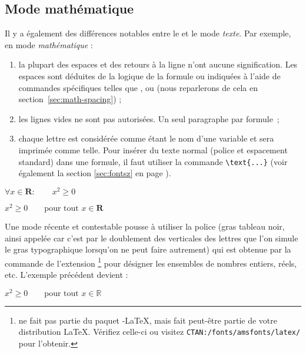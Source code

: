 \subsection{Mode mathématique}


Il y a également des différences notables entre le  et le mode \emph{texte}. Par exemple, en mode
\emph{mathématique} :

\begin{enumerate}
\item {}
      la plupart des espaces et des retours à la ligne n'ont aucune
      signification. Les espaces sont déduites de la logique de la
      formule ou indiquées à l'aide de commandes spécifiques telles
      que \ci{,},  ou (nous reparlerons de cela en
      section~\ref{sec:math-spacing}) ;
\item les lignes vides ne sont pas autorisées. Un seul paragraphe par
      formule~;
\item chaque lettre est considérée comme étant le nom d'une variable
      et sera imprimée comme telle. Pour insérer du  texte
      normal (police et espacement standard) dans une formule, il
      faut utiliser la commande \verb|\text{...}| (voir également la
      section \ref{sec:fontsz} en page \pageref{sec:fontsz}).
\end{enumerate}

\begin{example}
$\forall x \in \mathbf{R}:
 \qquad x^{2} \geq 0$
\end{example}
\begin{example}
$x^{2} \geq 0\qquad
\text{pour tout } x\in\mathbf{R}$
\end{example}

Une mode récente et contestable pousse à utiliser la police
 (gras tableau noir, ainsi appelée car c'est par
le doublement des verticales des lettres que l'on simule le gras
typographique lorsqu'on ne peut faire autrement) qui est obtenue par
la commande  de l'extension 
\footnote{ ne fait pas partie du paquet \AmS-\LaTeX{},
  mais fait peut-être partie de votre distribution \LaTeX{}. Vérifiez
  celle-ci ou visitez \texttt{CTAN:/fonts/amsfonts/latex/} pour
  l'obtenir.}
pour désigner les ensembles de nombres entiers, réels, etc.
\ifx\mathbb\undefined\else
L'exemple précédent devient :
\begin{example}
$x^{2} \geq 0\qquad
 \text{pour tout } x
 \in \mathbb{R}$
\end{example}
\fi

